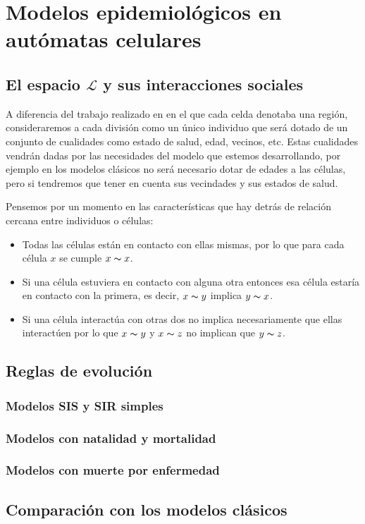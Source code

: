 \chapter{Modelos epidemiológicos en autómatas celulares}\label{ch:Modelos epidemiológicos en AC}

\section{El espacio $\mathcal{L}$ y sus interacciones sociales}
A diferencia del trabajo realizado en \cite{populationDensity} en el que cada celda denotaba una región, consideraremos a cada división como un único individuo que será dotado de un conjunto de cualidades como estado de salud, edad, vecinos, etc. Estas cualidades vendrán dadas por las necesidades del modelo que estemos desarrollando, por ejemplo en los modelos clásicos no será necesario dotar de edades a las células, pero si tendremos que tener en cuenta sus vecindades y sus estados de salud.

Pensemos por un momento en las características que hay detrás de relación cercana entre individuos o células:

\begin{itemize}
    \item Todas las células están en contacto con ellas mismas, por lo que para cada célula $x$ se cumple $x \thicksim x$.
    \item Si una célula estuviera en contacto con alguna otra entonces esa célula estaría en contacto con la primera, es decir, $x\thicksim y$ implica $y\thicksim x$.
    \item Si una célula interactúa con otras dos no implica necesariamente que ellas interactúen por lo que $x\thicksim y$ y $x\thicksim z$ no implican que $y\thicksim z$.
\end{itemize}



\section{Reglas de evolución}
\subsection{Modelos SIS y SIR simples}
\subsection{Modelos con natalidad y mortalidad}
\subsection{Modelos con muerte por enfermedad}
\section{Comparación con los modelos clásicos}